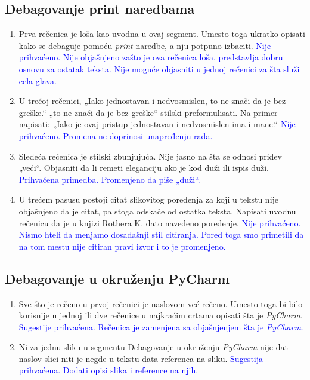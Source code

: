 \documentclass[a4paper]{report}
\newcommand{\odgovor}[1]{\textcolor{blue}{#1}}
\begin{document}
\subsection{Debagovanje print naredbama}
\begin{enumerate}
    \item Prva rečenica je loša kao uvodna u ovaj segment. Umesto toga ukratko opisati kako se debaguje pomoću \emph{print} naredbe, a nju potpuno izbaciti.
    \odgovor{Nije prihvaćeno. Nije objašnjeno zašto je ova rečenica loša, predstavlja dobru osnovu za ostatak teksta. Nije moguće objasniti u jednoj rečenici za šta služi cela glava.}
    \item U trećoj rečenici, „Iako jednostavan i nedvosmislen, to ne znači da je bez greške.“ „to ne znači da je bez greške“ stilski preformulisati. Na primer napisati:
    „Iako je ovaj pristup jednostavan i nedvosmislen ima i mane.“
    \odgovor{Nije prihvaćeno. Promena ne doprinosi unapređenju rada.}
    \item Sledeća rečenica je stilski zbunjujuća. Nije jasno na šta se odnosi pridev „veći“. Objasniti da li remeti eleganciju ako je kod duži ili ispis duži.
    \odgovor{Prihvaćena primedba. Promenjeno da piše „duži“.}
    \item U trećem pasusu postoji citat slikovitog poređenja za koji u tekstu nije objašnjeno da je citat, pa stoga odskače od ostatka teksta. Napisati uvodnu rečenicu da je u knjizi Rothera K. dato navedeno poređenje.
    \odgovor{Nije prihvaćeno. Nismo hteli da menjamo dosadašnji stil citiranja. Pored toga smo primetili da na tom mestu nije citiran pravi izvor i to je promenjeno.}
\end{enumerate}
\subsection{Debagovanje u okruženju PyCharm}
\begin{enumerate}
    \item Sve što je rečeno u prvoj rečenici je naslovom već rečeno. Umesto toga bi bilo korisnije u jednoj ili dve rečenice u najkraćim crtama opisati šta je \emph{PyCharm}.
    \odgovor{Sugestije prihvaćena. Rečenica je zamenjena sa objašnjenjem šta je \emph{PyCharm}.}
    \item Ni za jednu sliku u segmentu Debagovanje u okruženju \emph{PyCharm} nije dat naslov slici niti je negde u tekstu data referenca na sliku.
    \odgovor{Sugestija prihvaćena. Dodati opisi slika i reference na njih.}
\end{enumerate}
\end{document}

